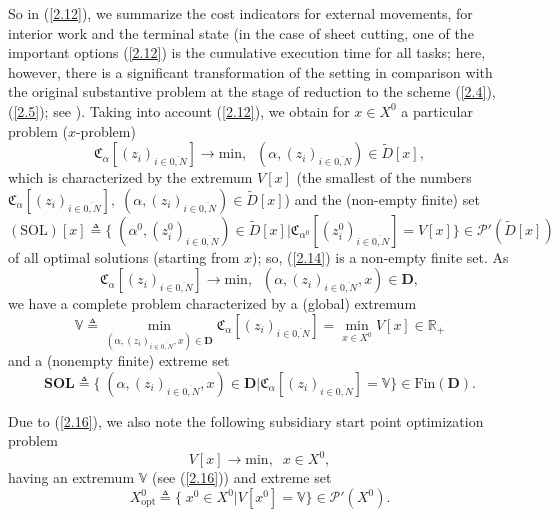 \documentclass[numbers,sort&compress]{IntechOpen-Book}%
\begin{document}
So in (\ref{2.12}),
we summarize the cost indicators for external movements,
for interior work and the terminal state
(in the case of sheet cutting,
one of the important options (\ref{2.12})
is the cumulative execution time for all tasks;
here, however,
there is a significant transformation of the setting
in comparison with the original substantive problem
at the stage of reduction to the scheme
 (\ref{2.4}), (\ref{2.5});
see \cite[$\S$3.3]{4}).
Taking into account (\ref{2.12}),
we obtain for
$ x \in X ^ 0 $
a particular problem
($ x $-problem)
\begin{equation}\label{2.13}
  \mathfrak{C}_{\alpha}[(z_i)_{i \in \overline{0,N}}] \longrightarrow
  \mathrm{min},\;\;(\alpha,(z_i)_{i \in \overline{0,N}}) \in \tilde{D}[x],
\end{equation}
which is characterized by the extremum
$V[x]$
(the smallest of the numbers
$\mathfrak{C}_{\alpha}[(z_i)_{i \in \overline{0,N}}],\;(\alpha,(z_i)_{i \in \overline{0,N}}) \in \tilde{D}[x]$)
and the
(non-empty finite)
set
\begin{equation}\label{2.14}
  (\mathrm{SOL})[x] {\triangleq}
  \{\;(\alpha^0,(z_i^0)_{i \in \overline{0,N}}) \in \tilde{D}[x] \vert
  \mathfrak{C}_{\alpha^0}[(z_i^0)_{i \in \overline{0,N}}] = V[x]\} \in \mathcal{P}'(\tilde{D}[x])
\end{equation}
of all optimal solutions
(starting from $x$);
so,
 (\ref{2.14})
is a non-empty finite set.
As
\begin{equation}\label{2.15}
  \mathfrak{C}_{\alpha}[(z_i)_{i \in \overline{0,N}}] \longrightarrow
  \mathrm{min},\;\;(\alpha,(z_i)_{i \in \overline{0,N}},x) \in \mathbf{D},
\end{equation}
we have a complete problem characterized by a (global) extremum
\begin{equation}\label{2.16}
  \mathbb{V} {\triangleq}
  \min\limits_{(\alpha,(z_i)_{i \in \overline{0,N}},x) \in
  \mathbf{D}}\mathfrak{C}_{\alpha}[(z_i)_{i \in \overline{0,N}}]
  = \min\limits_{x \in X^0} V[x] \in \mathbb{R}_+
\end{equation}
and a (nonempty finite) extreme set
\begin{equation}\label{2.17}
  \mathbf{SOL} {\triangleq}
  \{\;(\alpha,(z_i)_{i \in \overline{0,N}},x) \in \mathbf{D}
  \vert \mathfrak{C}_{\alpha}[(z_i)_{i \in \overline{0,N}}] =
  \mathbb{V}\} \in \mathrm{Fin}(\mathbf{D}).
\end{equation}

Due to (\ref{2.16}),
we also note the following
subsidiary
start point optimization problem
\begin{equation}\label{2.18}
  V[x] \longrightarrow \mathrm{min},\;\;x \in X^0,
\end{equation}
having an extremum
$\mathbb{V}$
(see (\ref{2.16}))
and extreme set
\begin{equation}\label{2.19}
  X^0_{\mathrm{opt}} {\triangleq} \{\;x^0 \in X^0 \vert V[x^0] = \mathbb{V}\} \in \mathcal{P}'(X^0).
\end{equation}
\end{document}

